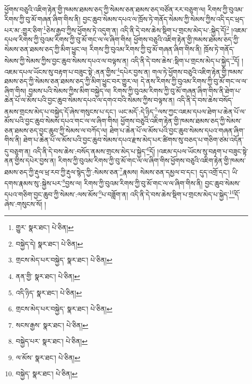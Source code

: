 ཕྱོགས་བཅུའི་འཇིག་རྟེན་གྱི་ཁམས་ཐམས་ཅད་ཀྱི་སེམས་ཅན་ཐམས་ཅད་བཙོན་རར་བཅུག་ལ། རིགས་ཀྱི་བུའམ་རིགས་ཀྱི་བུ་མོ་གཞན་ཞིག་གིས་ནི། བྱང་ཆུབ་སེམས་དཔའ་ལ་ཁྲོས་ཏེ་གནོད་སེམས་ཀྱི་སེམས་ཀྱིས་འདི་དང་ཕྲད་པར་མ་:གྱུར་ཅིག་\footnote{གྱུར་  སྣར་ཐང་།  པེ་ཅིན། }ཅེས་རྒྱབ་ཀྱིས་ཕྱོགས་ཏེ་འདུག་ན། འདི་ནི་དེ་བས་ཆེས་སྡིག་པ་གྲངས་མེད་པ་:སྐྱེད་དོ།\footnote{བསྐྱེད་དེ།  སྣར་ཐང་།  པེ་ཅིན། } །འཇམ་དཔལ་རིགས་ཀྱི་བུའམ་རིགས་ཀྱི་བུ་མོ་གང་ལ་ལ་ཞིག་གིས། ཕྱོགས་བཅུའི་འཇིག་རྟེན་གྱི་ཁམས་ཐམས་ཅད་ཀྱི་སེམས་ཅན་ཐམས་ཅད་ཀྱི་མིག་ཕྱུང་ལ། རིགས་ཀྱི་བུའམ་རིགས་ཀྱི་བུ་མོ་གཞན་ཞིག་གིས་ནི། ཁྲོས་ཏེ་གནོད་སེམས་ཀྱི་སེམས་ཀྱིས་བྱང་ཆུབ་སེམས་དཔའ་ལ་བལྟས་ན། འདི་ནི་དེ་བས་ཆེས་:སྡིག་པ་གྲངས་མེད་པ་སྐྱེད་\footnote{གྲངས་མེད་པར་བསྐྱེད་  སྣར་ཐང་།  པེ་ཅིན། }དོ། །འཇམ་དཔལ་ཡོངས་སུ་བརྟག་པ་བཟུང་སྟེ་:ནན་གྱིས་\footnote{ནན་གྱི་  སྣར་ཐང་།  པེ་ཅིན། }དཔེར་བྱས་ན། གལ་ཏེ་ཕྱོགས་བཅུའི་འཇིག་རྟེན་གྱི་ཁམས་ཐམས་ཅད་ཀྱི་སེམས་ཅན་ཐམས་ཅད་ཀྱི་མིག་ཕྱུང་བར་གྱུར་ལ། དེ་ནས་རིགས་ཀྱི་བུའམ་རིགས་ཀྱི་བུ་མོ་གང་ལ་ལ་ཞིག་གིས། བྱམས་པའི་སེམས་ཀྱིས་མིག་བསྐྱེད་ལ། རིགས་ཀྱི་བུའམ་རིགས་ཀྱི་བུ་མོ་གཞན་ཞིག་གིས་ནི་ཐེག་པ་ཆེན་པོ་ལ་མོས་པའི་བྱང་ཆུབ་སེམས་དཔའ་ལ་དགའ་བའི་སེམས་ཀྱིས་བལྟས་ན། འདི་ནི་དེ་བས་ཆེས་བསོད་ནམས་གྲངས་མེད་པ་བསྐྱེད་དོ་ཞེས་གསུངས་པ་དང་། ཡང་མདོ་:དེ་ཉིད་\footnote{འདི་ཉིད་  སྣར་ཐང་།  པེ་ཅིན། }ལས་ཀྱང་འཇམ་དཔལ་ཐེག་པ་ཆེན་པོ་ལ་མོས་པའི་བྱང་ཆུབ་སེམས་དཔའ་གང་ལ་ལ་ཞིག་གིས། ཕྱོགས་བཅུའི་འཇིག་རྟེན་གྱི་ཁམས་ཐམས་ཅད་ཀྱི་སེམས་ཅན་ཐམས་ཅད་བྱང་ཆུབ་ཀྱི་སེམས་ལ་བཀོད་ལ། ཐེག་པ་ཆེན་པོ་ལ་མོས་པའི་བྱང་ཆུབ་སེམས་དཔའ་གཞན་ཞིག་གིས་ནི། ཐེག་པ་ཆེན་པོ་ལ་མོས་པའི་བྱང་ཆུབ་སེམས་དཔའ་རྫས་མེད་པར་ཚིགས་སུ་བཅད་པ་གཅིག་ཙམ་འདོན་དུ་བཅུག་ན། འདི་ནི་དེ་བས་ཆེས་:བསོད་ནམས་གྲངས་མེད་པ་སྐྱེད་\footnote{གྲངས་མེད་པར་བསྐྱེད་  སྣར་ཐང་།  པེ་ཅིན། }དོ། །འཇམ་དཔལ་ཡོངས་སུ་བརྟག་པ་བཟུང་སྟེ་ནན་གྱིས་དཔེར་བྱས་ན། རིགས་ཀྱི་བུའམ་རིགས་ཀྱི་བུ་མོ་གང་ལ་ལ་ཞིག་གིས་ཕྱོགས་བཅུའི་འཇིག་རྟེན་གྱི་ཁམས་ཐམས་ཅད་ཀྱི་རྡུལ་ཕྲ་རབ་ཀྱི་རྡུལ་སྙེད་ཀྱི་:སེམས་ཅན་\footnote{སངས་རྒྱས་  སྣར་ཐང་།  པེ་ཅིན། }རྣམས། སེམས་ཅན་དམྱལ་བ་དང་། དུད་འགྲོ་དང་། ཡི་དགས་རྣམས་སུ་:སྐྱེས་པར་\footnote{བསྐྱེད་པར་  སྣར་ཐང་།  པེ་ཅིན། }བྱས་ལ། རིགས་ཀྱི་བུའམ་རིགས་ཀྱི་བུ་མོ་གང་ལ་ལ་ཞིག་གིས་ནི། བྱང་ཆུབ་སེམས་དཔའ་གཅིག་བྱང་ཆུབ་ཀྱི་སེམས་:ལས་མོས་\footnote{ལ་མོས་  སྣར་ཐང་།  པེ་ཅིན། }པ་བཟློག་ན། འདི་ནི་དེ་བས་ཆེས་སྡིག་པ་གྲངས་མེད་པ་སྐྱེད་\footnote{བསྐྱེད་  སྣར་ཐང་།  པེ་ཅིན། }དོ་ཞེས་:གསུངས་སོ། །
